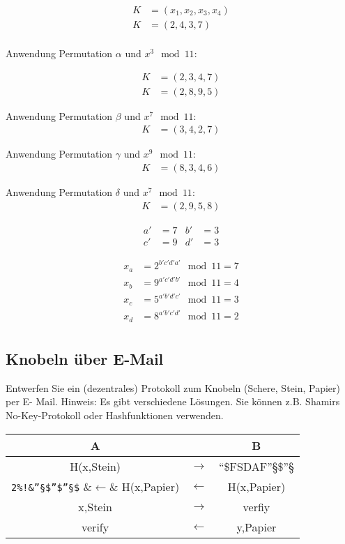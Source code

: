 \begin{align}
	K &= ( x_1 , x_{2}, x_{3}, x_{4}) \\
	K &= ( 2 , 4 , 3, 7) \\	
\end{align}

Anwendung Permutation $\alpha$ und $x^3 \mod 11$:

\begin{align}
	K &= ( 2 , 3 , 4, 7) \\	
	K &= (2, 8, 9 , 5)    
\end{align}

Anwendung Permutation $\beta$ und $x^7 \mod 11$:
\begin{align}
	K &= (3, 4 , 2, 7)	
\end{align}

Anwendung Permutation $\gamma$ und $x^9 \mod 11$:
\begin{align}
	K &= (8, 3, 4, 6)
\end{align}

Anwendung Permutation $\delta$ und $x^7 \mod 11$:
\begin{align}
	K &= (2, 9, 5, 8)
\end{align}

\begin{align}
a' &= 7 & b' &= 3 \\
c' &= 9 & d' &= 3 
\end{align}

\begin{align}
	x_a &= 2^{b'c'd'a'} \mod 11 = 7   \\
	x_b &= 9^{a'c'd'b'} \mod 11 = 4   \\
	x_c &= 5^{a'b'd'c'} \mod 11 = 3   \\
	x_d &= 8^{a'b'c'd'} \mod 11 = 2   \\
\end{align}

\subsection{Knobeln über E-Mail}
Entwerfen Sie ein (dezentrales) Protokoll zum Knobeln (Schere, Stein, Papier) per E-
Mail. Hinweis: Es gibt verschiedene Lösungen. Sie können z.B. Shamirs No-Key-Protokoll
oder Hashfunktionen verwenden.


\newcommand{\rarr}{$\rightarrow$}
\newcommand{\larr}{$\leftarrow$}
\begin{tabular}{ccc}
	A      &  &  B \\
                  \hline
    H(x,Stein)          &\rarr &    “\$FSDAF”§\$”§ \\
    \verb+2%!&”§$”$”§$+ &\larr &     H(x,Papier)   \\
            x,Stein     &\rarr &    verfiy			\\
            verify      &\larr &    y,Papier
\end{tabular}

